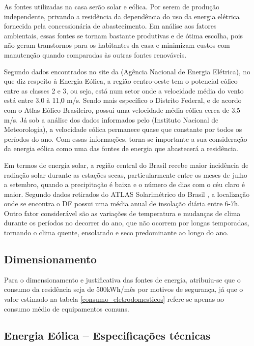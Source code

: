 \newpage

	As fontes utilizadas na casa serão solar e eólica. Por serem de produção independente, privando a residência da dependência do uso da energia elétrica fornecida pela concessionária de abastecimento. Em análise aos fatores ambientais, essas fontes se tornam bastante produtivas e de ótima escolha, pois não geram transtornos para os habitantes da casa e minimizam custos com manutenção quando comparadas às outras fontes renováveis.

	Segundo dados encontrados no site da \cite{2013Aneel} (Agência Nacional de Energia Elétrica), no que diz respeito à Energia Eólica, a região centro-oeste tem o potencial eólico entre as classes 2 e 3, ou seja, está num setor onde a velocidade média do vento está entre 3,0 à 11,0 m/s. Sendo mais específico o Distrito Federal, e de acordo com o Atlas Eólico Brasileiro, possui uma velocidade média eólica cerca de 3,5 m/s. Já sob a análise dos dados informados pelo \cite{INMET} (Instituto Nacional de Meteorologia), a velocidade eólica permanece quase que constante por todos os períodos do ano. Com essas informações, torna-se importante a sua consideração da energia eólica como uma das fontes de energia que abastecerá a residência.

	Em termos de energia solar, a região central do Brasil recebe maior incidência de radiação solar durante as estações secas, particularmente entre os meses de julho a setembro, quando a precipitação é baixa e o número de dias com o céu claro é maior. Segundo dados retirados do ATLAS Solarimétrico do Brasil \cite{2000UFPE}, a localização onde se encontra o DF possui uma média anual de insolação diária entre 6-7h. Outro fator considerável são as variações de temperatura e mudanças de clima durante os períodos no decorrer do ano, que não ocorrem por longas temporadas, tornando o clima quente, ensolarado e seco predominante ao longo do ano.

\subsection{Dimensionamento}

	Para o dimensionamento e justificativa das fontes de energia, atribuiu-se que o consumo da residência seja de 500kWh/mês por motivos de segurança, já que o valor estimado na tabela \ref{consumo_eletrodomesticos} refere-se apenas ao consumo médio de equipamentos comuns.

\subsection{Energia Eólica -- Especificações técnicas}

